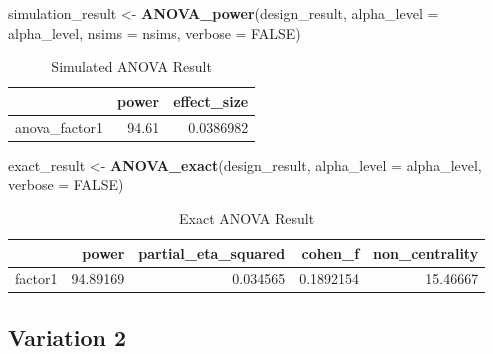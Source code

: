 \documentclass[
]{book}
\newenvironment{Shaded}{\begin{snugshade}}{\end{snugshade}}
\newcommand{\DataTypeTok}[1]{\textcolor[rgb]{0.13,0.29,0.53}{#1}}
\newcommand{\KeywordTok}[1]{\textcolor[rgb]{0.13,0.29,0.53}{\textbf{#1}}}
\newcommand{\NormalTok}[1]{#1}
\newcommand{\OtherTok}[1]{\textcolor[rgb]{0.56,0.35,0.01}{#1}}
\newcommand{\StringTok}[1]{\textcolor[rgb]{0.31,0.60,0.02}{#1}}
\begin{document}
\begin{Shaded}
\begin{Highlighting}[]
\NormalTok{simulation_result <-}\StringTok{ }\KeywordTok{ANOVA_power}\NormalTok{(design_result, }
                                 \DataTypeTok{alpha_level =}\NormalTok{ alpha_level, }
                                 \DataTypeTok{nsims =}\NormalTok{ nsims,}
                                 \DataTypeTok{verbose =} \OtherTok{FALSE}\NormalTok{)}
\end{Highlighting}
\end{Shaded}

\begin{table}[!h]

\caption{\label{tab:unnamed-chunk-323}Simulated ANOVA Result}
\centering
\begin{tabular}[t]{l|r|r}
\hline
  & power & effect\_size\\
\hline
anova\_factor1 & 94.61 & 0.0386982\\
\hline
\end{tabular}
\end{table}

\begin{Shaded}
\begin{Highlighting}[]
\NormalTok{exact_result <-}\StringTok{ }\KeywordTok{ANOVA_exact}\NormalTok{(design_result,}
                            \DataTypeTok{alpha_level =}\NormalTok{ alpha_level,}
                            \DataTypeTok{verbose =} \OtherTok{FALSE}\NormalTok{)}
\end{Highlighting}
\end{Shaded}

\begin{table}[!h]

\caption{\label{tab:unnamed-chunk-325}Exact ANOVA Result}
\centering
\begin{tabular}[t]{l|r|r|r|r}
\hline
  & power & partial\_eta\_squared & cohen\_f & non\_centrality\\
\hline
factor1 & 94.89169 & 0.034565 & 0.1892154 & 15.46667\\
\hline
\end{tabular}
\end{table}

\hypertarget{variation-2}{%
\subsection{Variation 2}\label{variation-2}}
\end{document}
